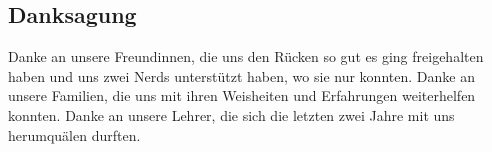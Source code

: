 \subsection{Danksagung}\label{fz_danksagung}
Danke an unsere Freundinnen, die uns den Rücken so gut es ging freigehalten haben und uns zwei Nerds unterstützt haben, wo sie nur konnten.
Danke an unsere Familien, die uns mit ihren Weisheiten und Erfahrungen weiterhelfen konnten.
Danke an unsere Lehrer, die sich die letzten zwei Jahre mit uns herumquälen durften.